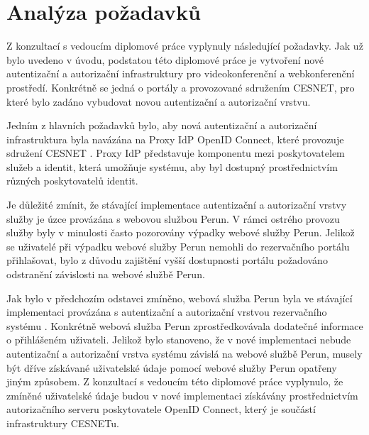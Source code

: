 \documentclass[
  printed, %
  twoside, %
  table,   %
  nolof,     %
  nolot,     %
]{fithesis3}
\begin{document}
\section{Analýza požadavků}
Z konzultací s vedoucím diplomové práce vyplynuly následující požadavky. Jak už bylo uvedeno v úvodu, podstatou této diplomové práce je vytvoření nové autentizační a autorizační infrastruktury pro videokonferenční a webkonferenční prostředí. Konkrétně se jedná o portály  a  provozované sdružením CESNET, pro které bylo zadáno vybudovat novou autentizační a autorizační vrstvu. 

\par
Jedním z hlavních požadavků bylo, aby nová autentizační a autorizační infrastruktura byla navázána na Proxy IdP OpenID Connect, které provozuje sdružení CESNET \cite{proxyIdpPresentation}. Proxy IdP představuje komponentu mezi poskytovatelem služeb a identit, která umožňuje systému, aby byl dostupný prostřednictvím různých poskytovatelů identit. 
\par

\par 
Je důležité zmínit, že stávající implementace autentizační a autorizační vrstvy služby  je úzce provázána s webovou službou Perun. V rámci ostrého provozu služby  byly v minulosti často pozorovány výpadky webové služby Perun. Jelikož se uživatelé při výpadku webové služby Perun nemohli do rezervačního portálu  přihlašovat, bylo z důvodu zajištění vyšší dostupnosti portálu  požadováno odstranění závislosti na webové službě Perun. 

\par 

Jak bylo v předchozím odstavci zmíněno, webová služba Perun byla ve stávající implementaci provázána s autentizační a autorizační vrstvou rezervačního systému . Konkrétně webová služba Perun zprostředkovávala dodatečné informace o přihlášeném uživateli. Jelikož bylo stanoveno, že v nové implementaci nebude autentizační a autorizační vrstva systému  závislá na webové službě Perun, musely být dříve získávané uživatelské údaje pomocí webové služby Perun opatřeny jiným způsobem. Z konzultací s vedoucím této diplomové práce vyplynulo, že zmíněné uživatelské údaje budou v nové implementaci získávány prostřednictvím autorizačního serveru poskytovatele OpenID Connect, který je součástí infrastruktury CESNETu.     
\end{document}
